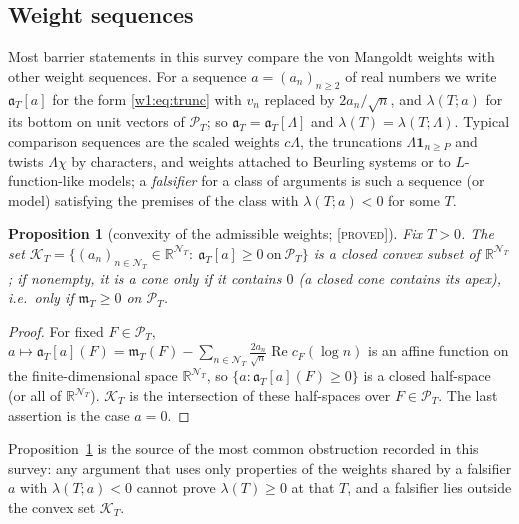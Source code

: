 \documentclass[11pt]{amsart}
\newtheorem{proposition}[theorem]{Proposition}
\theoremstyle{definition}
\theoremstyle{remark}
\numberwithin{equation}{section}
\newcommand{\R}{\mathbb{R}}
\DeclareMathOperator{\Rel}{Re}
\newcommand{\cF}{c_F}                                  %
\newcommand{\PT}{\mathcal{P}_T}                        %
\newcommand{\NT}{\mathcal{N}_T}                        %
\newcommand{\mT}{\mathfrak{m}_T}                       %
\newcommand{\aT}{\mathfrak{a}_T}                       %
\newcommand{\lam}{\lambda(T)}                          %
\newcommand{\stag}[1]{\textsc{[#1]}}
\newcommand{\PROVED}{\stag{proved}}
\begin{document}
\subsection{Weight sequences}\label{w1:subsec:weights}
Most barrier statements in this survey compare the von Mangoldt weights with
other weight sequences. For a sequence $a=(a_n)_{n\ge2}$ of real numbers we
write $\aT[a]$ for the form \eqref{w1:eq:trunc} with $v_n$ replaced by
$2a_n/\sqrt n$, and $\lambda(T;a)$ for its bottom on unit vectors of $\PT$; so
$\aT=\aT[\Lambda]$ and $\lam=\lambda(T;\Lambda)$. Typical comparison sequences
are the scaled weights $c\Lambda$, the truncations $\Lambda\mathbf 1_{n\ge P}$ and
twists $\Lambda\chi$ by characters, and weights attached to Beurling systems
or to $L$-function-like models; a \emph{falsifier} for a class of arguments is
such a sequence (or model) satisfying the premises of the class with
$\lambda(T;a)<0$ for some $T$.

\begin{proposition}[convexity of the admissible weights; \PROVED]\label{w1:prop:convex}
Fix $T>0$. The set
$\mathcal K_T=\{(a_n)_{n\in\NT}\in\R^{\NT}:\ \aT[a]\ge0\ \text{on}\ \PT\}$
is a closed convex subset of $\R^{\NT}$; if nonempty, it is a cone only if it
contains $0$ (a closed cone contains its apex), i.e.\ only if $\mT\ge0$ on $\PT$.
\end{proposition}

\begin{proof}
For fixed $F\in\PT$, $a\mapsto\aT[a](F)=\mT(F)-\sum_{n\in\NT}\frac{2a_n}{\sqrt n}\Rel\cF(\log n)$
is an affine function on the finite-dimensional space $\R^{\NT}$, so
$\{a:\aT[a](F)\ge0\}$ is a closed half-space (or all of $\R^{\NT}$).
$\mathcal K_T$ is the intersection of these half-spaces over $F\in\PT$.
The last assertion is the case $a=0$.
\end{proof}

Proposition~\ref{w1:prop:convex} is the source of the most common
obstruction recorded in this survey: any argument that uses only properties
of the weights shared by a falsifier $a$ with $\lambda(T;a)<0$ cannot prove
$\lam\ge0$ at that $T$, and a falsifier lies outside the convex set
$\mathcal K_T$.
\end{document}
